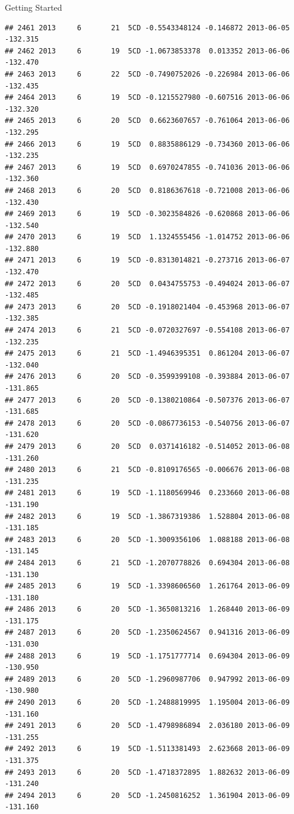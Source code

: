 \documentclass[
  ignorenonframetext,
]{beamer}
\begin{document}
\begin{frame}[fragile]{Getting Started}
\begin{verbatim}
## 2461 2013     6       21  5CD -0.5543348124 -0.146872 2013-06-05 -132.315
## 2462 2013     6       19  5CD -1.0673853378  0.013352 2013-06-06 -132.470
## 2463 2013     6       22  5CD -0.7490752026 -0.226984 2013-06-06 -132.435
## 2464 2013     6       19  5CD -0.1215527980 -0.607516 2013-06-06 -132.320
## 2465 2013     6       20  5CD  0.6623607657 -0.761064 2013-06-06 -132.295
## 2466 2013     6       19  5CD  0.8835886129 -0.734360 2013-06-06 -132.235
## 2467 2013     6       19  5CD  0.6970247855 -0.741036 2013-06-06 -132.360
## 2468 2013     6       20  5CD  0.8186367618 -0.721008 2013-06-06 -132.430
## 2469 2013     6       19  5CD -0.3023584826 -0.620868 2013-06-06 -132.540
## 2470 2013     6       19  5CD  1.1324555456 -1.014752 2013-06-06 -132.880
## 2471 2013     6       19  5CD -0.8313014821 -0.273716 2013-06-07 -132.470
## 2472 2013     6       20  5CD  0.0434755753 -0.494024 2013-06-07 -132.485
## 2473 2013     6       20  5CD -0.1918021404 -0.453968 2013-06-07 -132.385
## 2474 2013     6       21  5CD -0.0720327697 -0.554108 2013-06-07 -132.235
## 2475 2013     6       21  5CD -1.4946395351  0.861204 2013-06-07 -132.040
## 2476 2013     6       20  5CD -0.3599399108 -0.393884 2013-06-07 -131.865
## 2477 2013     6       20  5CD -0.1380210864 -0.507376 2013-06-07 -131.685
## 2478 2013     6       20  5CD -0.0867736153 -0.540756 2013-06-07 -131.620
## 2479 2013     6       20  5CD  0.0371416182 -0.514052 2013-06-08 -131.260
## 2480 2013     6       21  5CD -0.8109176565 -0.006676 2013-06-08 -131.235
## 2481 2013     6       19  5CD -1.1180569946  0.233660 2013-06-08 -131.190
## 2482 2013     6       19  5CD -1.3867319386  1.528804 2013-06-08 -131.185
## 2483 2013     6       20  5CD -1.3009356106  1.088188 2013-06-08 -131.145
## 2484 2013     6       21  5CD -1.2070778826  0.694304 2013-06-08 -131.130
## 2485 2013     6       19  5CD -1.3398606560  1.261764 2013-06-09 -131.180
## 2486 2013     6       20  5CD -1.3650813216  1.268440 2013-06-09 -131.175
## 2487 2013     6       20  5CD -1.2350624567  0.941316 2013-06-09 -131.030
## 2488 2013     6       19  5CD -1.1751777714  0.694304 2013-06-09 -130.950
## 2489 2013     6       20  5CD -1.2960987706  0.947992 2013-06-09 -130.980
## 2490 2013     6       20  5CD -1.2488819995  1.195004 2013-06-09 -131.160
## 2491 2013     6       20  5CD -1.4798986894  2.036180 2013-06-09 -131.255
## 2492 2013     6       19  5CD -1.5113381493  2.623668 2013-06-09 -131.375
## 2493 2013     6       20  5CD -1.4718372895  1.882632 2013-06-09 -131.240
## 2494 2013     6       20  5CD -1.2450816252  1.361904 2013-06-09 -131.160

\end{verbatim}
\end{frame}
\end{document}
